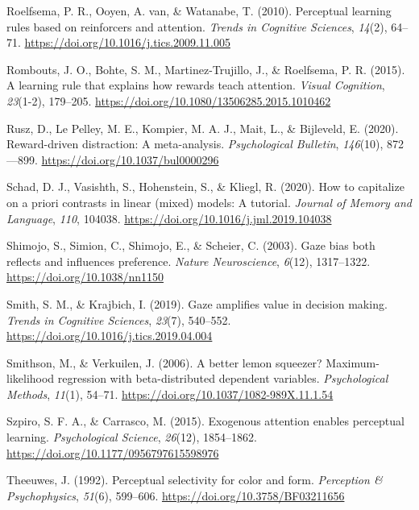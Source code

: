 \documentclass[
  man,
  floatsintext,
  longtable,
  nolmodern,
  notxfonts,
  notimes,
  mask,
  colorlinks=true,linkcolor=blue,citecolor=blue,urlcolor=blue]{apa7}
\newlength{\cslhangindent}
\newenvironment{CSLReferences}[2] %
 {\begin{list}{}{%
  \setlength{\itemindent}{0pt}
  \setlength{\leftmargin}{0pt}
  \setlength{\parsep}{0pt}
  \ifodd #1
   \setlength{\leftmargin}{\cslhangindent}
   \setlength{\itemindent}{-1\cslhangindent}
  \fi
  \setlength{\itemsep}{#2\baselineskip}}}
 {\end{list}}
\begin{document}
\begin{CSLReferences}{1}{0}
Roelfsema, P. R., Ooyen, A. van, \& Watanabe, T. (2010). Perceptual
learning rules based on reinforcers and attention. \emph{Trends in
Cognitive Sciences}, \emph{14}(2), 64--71.
\url{https://doi.org/10.1016/j.tics.2009.11.005}

Rombouts, J. O., Bohte, S. M., Martinez-Trujillo, J., \& Roelfsema, P.
R. (2015). A learning rule that explains how rewards teach attention.
\emph{Visual Cognition}, \emph{23}(1-2), 179--205.
\url{https://doi.org/10.1080/13506285.2015.1010462}

Rusz, D., Le Pelley, M. E., Kompier, M. A. J., Mait, L., \& Bijleveld,
E. (2020). Reward-driven distraction: A meta-analysis.
\emph{Psychological Bulletin}, \emph{146}(10), 872---899.
\url{https://doi.org/10.1037/bul0000296}

Schad, D. J., Vasishth, S., Hohenstein, S., \& Kliegl, R. (2020). How to
capitalize on a priori contrasts in linear (mixed) models: A tutorial.
\emph{Journal of Memory and Language}, \emph{110}, 104038.
\url{https://doi.org/10.1016/j.jml.2019.104038}

Shimojo, S., Simion, C., Shimojo, E., \& Scheier, C. (2003). Gaze bias
both reflects and influences preference. \emph{Nature Neuroscience},
\emph{6}(12), 1317--1322. \url{https://doi.org/10.1038/nn1150}

Smith, S. M., \& Krajbich, I. (2019). Gaze amplifies value in decision
making. \emph{Trends in Cognitive Sciences}, \emph{23}(7), 540--552.
\url{https://doi.org/10.1016/j.tics.2019.04.004}

Smithson, M., \& Verkuilen, J. (2006). A better lemon squeezer?
Maximum-likelihood regression with beta-distributed dependent variables.
\emph{Psychological Methods}, \emph{11}(1), 54--71.
\url{https://doi.org/10.1037/1082-989X.11.1.54}

Szpiro, S. F. A., \& Carrasco, M. (2015). Exogenous attention enables
perceptual learning. \emph{Psychological Science}, \emph{26}(12),
1854--1862. \url{https://doi.org/10.1177/0956797615598976}

Theeuwes, J. (1992). Perceptual selectivity for color and form.
\emph{Perception \& Psychophysics}, \emph{51}(6), 599--606.
\url{https://doi.org/10.3758/BF03211656}


\end{CSLReferences}
\end{document}
